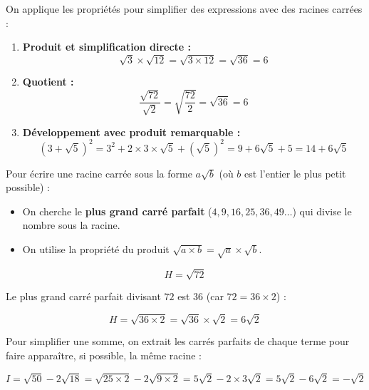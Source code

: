 \begin{ex}
	On applique les propriétés pour simplifier des expressions avec des racines carrées :

	\begin{enumerate}
		\item \textbf{Produit et simplification directe :}
		      \[
			      \sqrt{3} \times \sqrt{12} = \sqrt{3 \times 12} = \sqrt{36} = 6
		      \]

		\item \textbf{Quotient :}
		      \[
			      \frac{\sqrt{72}}{\sqrt{2}} = \sqrt{\frac{72}{2}} = \sqrt{36} = 6
		      \]

		\item \textbf{Développement avec produit remarquable :}
		      \[
			      \left( 3 + \sqrt{5} \right)^2 = 3^2 + 2 \times 3 \times \sqrt{5} + \left( \sqrt{5} \right)^2 = 9 + 6\sqrt{5} + 5 = 14 + 6\sqrt{5}
		      \]
	\end{enumerate}
\end{ex}

\newpage

\begin{meth}
	Pour écrire une racine carrée sous la forme $a\sqrt{b}$ (où $b$ est l'entier le plus petit possible) :

	\begin{itemize}
		\item On cherche le \textbf{plus grand carré parfait} ($4, 9, 16, 25, 36, 49 \dots$) qui divise le nombre sous la racine.
		\item On utilise la propriété du produit $\sqrt{a \times b} = \sqrt{a} \times \sqrt{b}$.
	\end{itemize}

	\[
		H = \sqrt{72}
	\]

	Le plus grand carré parfait divisant $72$ est $36$ (car $72 = 36 \times 2$) :

	\[
		H = \sqrt{36 \times 2} = \sqrt{36} \times \sqrt{2} = 6\sqrt{2}
	\]
\end{meth}

\begin{meth}
	Pour simplifier une somme, on extrait les carrés parfaits de chaque terme pour faire apparaître, si possible, la même racine :

	\[
		I = \sqrt{50} - 2\sqrt{18} = \sqrt{25 \times 2} - 2\sqrt{9 \times 2} = 5\sqrt{2} - 2 \times 3\sqrt{2} = 5\sqrt{2} - 6\sqrt{2} = -\sqrt{2}
	\]
\end{meth}

